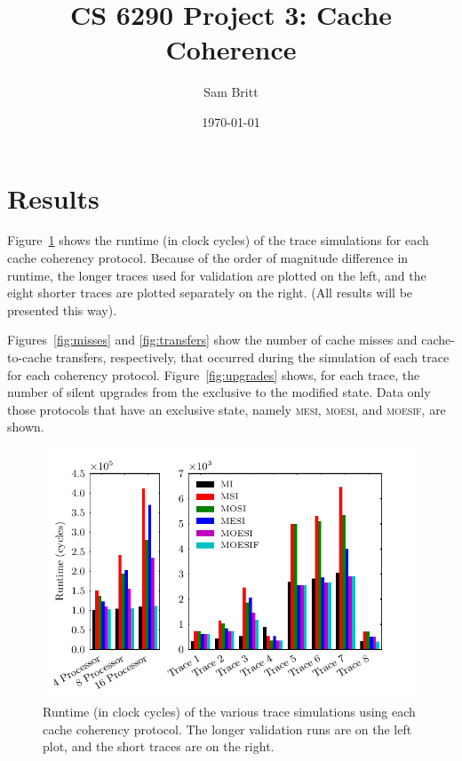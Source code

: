 \documentclass{article}
\title{CS 6290 Project 3: Cache Coherence}
\author{Sam Britt}
\date{\today}
\newcommand\figsize{.9\linewidth}
\newcommand\prot[1]{\textsc{#1}}
\newcommand\MESI{\prot{mesi}\xspace}
\newcommand\MOESI{\prot{moesi}\xspace}
\newcommand\MOESIF{\prot{moesif}\xspace}
\begin{document}
  \maketitle

  \section{Results}
  \label{sec:results}
  Figure~\ref{fig:runtime} shows the runtime (in clock cycles) of the
  trace simulations for each cache coherency protocol. Because of the
  order of magnitude difference in runtime, the longer traces used for
  validation are plotted on the left, and the eight shorter traces are
  plotted separately on the right. (All results will be presented this
  way).

  Figures~\ref{fig:misses} and \ref{fig:transfers} show the number of
  cache misses and cache-to-cache transfers, respectively, that
  occurred during the simulation of each trace for each coherency
  protocol. Figure~\ref{fig:upgrades} shows, for each trace, the
  number of silent upgrades from the exclusive to the modified state.
  Data only those protocols that have an exclusive state, namely
  \MESI, \MOESI, and \MOESIF, are shown.

  \begin{figure}[htbp]
    \label{fig:runtime}
    \centering
    \begin{minipage}[t]{\figsize}
      \centering
      \includegraphics[width=\linewidth]{../runs/plots/runtime}
      \caption{Runtime (in clock cycles) of the various trace
        simulations using each cache coherency protocol. The longer
        validation runs are on the left plot, and the short traces are
        on the right.}
    \end{minipage}
  \end{figure}
\end{document}
